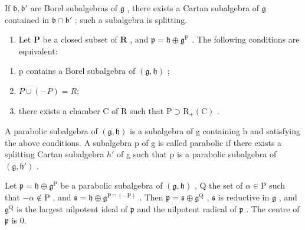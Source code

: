 If \(\mathfrak{b},\mathfrak{b}'\) are Borel subalgebras of \(\mathfrak{g}\) , there exists a Cartan subalgebra of \(\mathfrak{g}\) contained in \(\mathfrak{b} \cap \mathfrak{b}'\) ; such a subalgebra is splitting.

\begin{enumerate}
\def\labelenumi{\arabic{enumi})}
\setcounter{enumi}{14}
\tightlist
\item
  Let \(\mathbf{P}\) be a closed subset of \(\mathbf{R}\) , and \(\mathfrak{p} = \mathfrak{h} \oplus \mathfrak{g}^{\mathrm{P}}\) . The following conditions are equivalent:
\end{enumerate}

\begin{enumerate}
\def\labelenumi{(\roman{enumi})}
\item
  p contains a Borel subalgebra of \((\mathfrak{g}, \mathfrak{h})\) ;
\item
  \(P \cup (-P) = R;\)
\item
  there exists a chamber C of R such that \(\mathrm{P} \supset \mathrm{R}_{+}(\mathrm{C})\) .
\end{enumerate}

A parabolic subalgebra of \((\mathfrak{g},\mathfrak{h})\) is a subalgebra of g containing h and satisfying the above conditions. A subalgebra p of g is called parabolic if there exists a splitting Cartan subalgebra \(h'\) of g such that p is a parabolic subalgebra of \((\mathfrak{g},\mathfrak{h}')\) .

Let \(\mathfrak{p} = \mathfrak{h} \oplus \mathfrak{g}^{\mathrm{P}}\) be a parabolic subalgebra of \((\mathfrak{g}, \mathfrak{h})\) , Q the set of \(\alpha \in \mathrm{P}\) such that \(-\alpha \notin \mathrm{P}\) , and \(\mathfrak{s} = \mathfrak{h} \oplus \mathfrak{g}^{\mathrm{P} \cap (-\mathrm{P})}\) . Then \(\mathfrak{p} = \mathfrak{s} \oplus \mathfrak{g}^{\mathrm{Q}}\) , \(\mathfrak{s}\) is reductive in \(\mathfrak{g}\) , and \(\mathfrak{g}^{\mathrm{Q}}\) is the largest nilpotent ideal of \(\mathfrak{p}\) and the nilpotent radical of \(\mathfrak{p}\) . The centre of \(\mathfrak{p}\) is 0.

